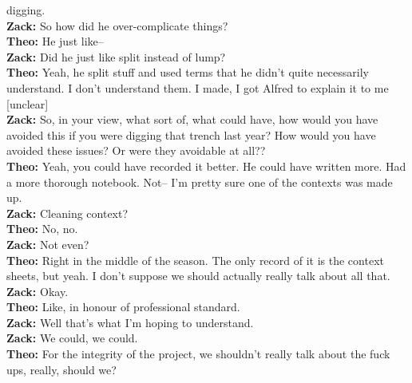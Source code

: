 \documentclass{article}
\begin{document}
digging.\\
\textbf{Zack:} So how did he over-complicate things?\\
\textbf{Theo:} He just like--\\
\textbf{Zack:} Did he just like split instead of lump?\\
\textbf{Theo:} Yeah, he split stuff and used terms that he didn't quite
necessarily understand. I don't understand them. I made, I got Alfred to
explain it to me {[}unclear{]}\\
\textbf{Zack:} So, in your view, what sort of, what could have, how
would you have avoided this if you were digging that trench last year?
How would you have avoided these issues? Or were they avoidable at
all??\\
\textbf{Theo:} Yeah, you could have recorded it better. He could have
written more. Had a more thorough notebook. Not-- I'm pretty sure one of
the contexts was made up.\\
\textbf{Zack:} Cleaning context?\\
\textbf{Theo:} No, no.\\
\textbf{Zack:} Not even?\\
\textbf{Theo:} Right in the middle of the season. The only record of it
is the context sheets, but yeah. I don't suppose we should actually
really talk about all that.\\
\textbf{Zack:} Okay.\\
\textbf{Theo:} Like, in honour of professional standard.\\
\textbf{Zack:} Well that's what I'm hoping to understand.\\
\textbf{Zack:} We could, we could.\\
\textbf{Theo:} For the integrity of the project, we shouldn't really
talk about the fuck ups, really, should we?\newline
\end{document}
